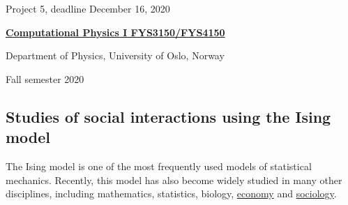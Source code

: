 \documentclass[%
oneside,                 %
final,                   %
10pt]{article}
\begin{document}

\newcommand{\exercisesection}[1]{\subsection*{#1}}






\thispagestyle{empty}

\begin{center}
{\LARGE\bf
\begin{spacing}{1.25}
Project 5, deadline  December 16, 2020
\end{spacing}
}
\end{center}


\begin{center}
{\bf \href{{http://www.uio.no/studier/emner/matnat/fys/FYS3150/index-eng.html}}{Computational Physics I FYS3150/FYS4150}}
\end{center}

    \begin{center}
\centerline{{\small Department of Physics, University of Oslo, Norway}}
\end{center}
    

\begin{center}
Fall semester 2020
\end{center}

\vspace{1cm}


\subsection{Studies of social interactions using the Ising model}

The Ising model is one of the most
frequently used models of statistical mechanics. Recently, this
model has also become widely studied in many other disciplines, including mathematics, statistics, biology, \href{{https://www.springer.com/gp/book/9783319477046}}{economy} and \href{{https://www.springer.com/gp/book/9781461420316}}{sociology}.
\end{document}
